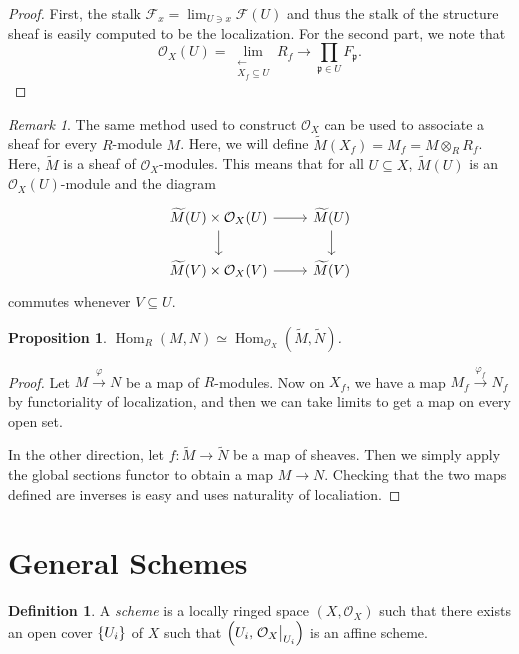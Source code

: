 \documentclass[leqno, openany]{memoir}
\newtheorem{prop}[thm]{Proposition}
\theoremstyle{definition}
\newtheorem{defn}[thm]{Definition}
\theoremstyle{remark}
\newtheorem{rmk}[thm]{Remark}
\theoremstyle{plain}
\theoremstyle{definition}
\theoremstyle{remark}
\newcommand{\mc}[1]{\mathcal{#1}}
\newcommand{\mf}[1]{\mathfrak{#1}}
\newcommand{\wt}[1]{\widetilde{#1}}
\DeclareMathOperator{\Hom}{Hom}
\begin{document}
\begin{proof} First, the stalk $\mc{F}_x = \lim_{U \ni x} \mc{F}(U)$ and thus
    the stalk of the structure sheaf is easily computed to be the localization.
    For the second part, we note that \[ \mc{O}_X(U) =
    \lim_{\substack{\longleftarrow \\ X_f \subseteq U}} R_f \longrightarrow
\prod_{\mf{p} \in U} F_{\mf{p}}. \] \end{proof}

\begin{rmk} The same method used to construct $\mc{O}_X$ can be used to
    associate a sheaf for every $R$-module $M$. Here, we will define
    $\wt{M}(X_f) = M_f = M \otimes_R R_f$. Here, $\wt{M}$ is a sheaf of
    $\mc{O}_X$-modules. This means that for all $U \subseteq X$, $\wt{M}(U)$ is
    an $\mc{O}_X(U)$-module and the diagram \begin{equation*} \begin{tikzcd}
    \wt{M}(U) \times \mc{O}_X(U) \arrow{r} \arrow{d} & \wt{M}(U) \arrow{d} \\
\wt{M}(V) \times \mc{O}_X(V) \arrow{r} & \wt{M}(V) \end{tikzcd} \end{equation*}
commutes whenever $V \subseteq U$.  \end{rmk}

\begin{prop} $\Hom_R(M,N) \simeq \Hom_{\mc{O}_X}(\wt{M}, \wt{N})$.  \end{prop}

\begin{proof} Let $M \xrightarrow{\varphi} N$ be a map of $R$-modules. Now on
    $X_f$, we have a map $M_f \xrightarrow{\varphi_f} N_f$ by functoriality of
    localization, and then we can take limits to get a map on every open set.

    In the other direction, let $f \colon \wt{M} \to \wt{N}$ be a map of
sheaves. Then we simply apply the global sections functor to obtain a map $M
\to N$. Checking that the two maps defined are inverses is easy and uses
naturality of localiation.  \end{proof}

\section{General Schemes}%

\begin{defn} A \textit{scheme} is a locally ringed space $(X, \mc{O}_X)$ such
that there exists an open cover $\qty{U_i}$ of $X$ such that $\qty(U_i,
\eval{\mc{O}_X}_{U_i})$ is an affine scheme.  \end{defn}
\end{document}

